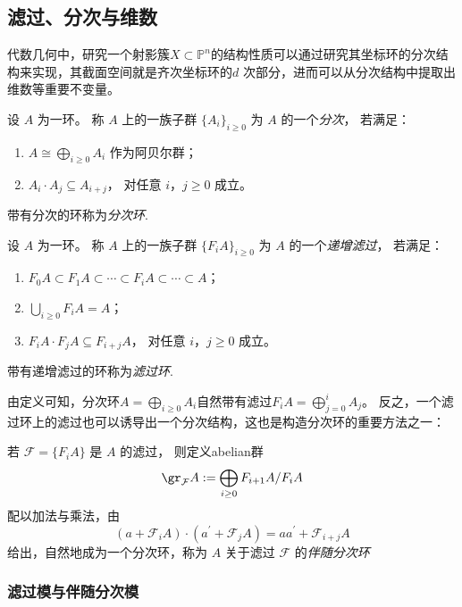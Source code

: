 \subsection{滤过、分次与维数}
代数几何中，研究一个射影簇$X\subset \mathbb{P}^n$的结构性质可以通过研究其坐标环的分次结构来实现，其截面空间就是齐次坐标环的$d$ 次部分，进而可以从分次结构中提取出维数等重要不变量。

\begin{definition}
    设 $A$ 为一环。 称 $A$ 上的一族子群 $\{A_i\}_{i\ge0}$ 为
    $A$ 的一个\emph{分次}，
    若满足：
    \begin{enumerate}[label=(\roman*)]
        \item
              $A\cong \bigoplus_{i\ge0}A_i$ 作为阿贝尔群；
        \item
              $A_i\cdot A_j\subseteq A_{i+j}$，
              对任意 $i，j\ge0$ 成立。
    \end{enumerate}
    带有分次的环称为\emph{分次环}.
\end{definition}


\begin{definition}
    设 $A$ 为一环。
    称 $A$ 上的一族子群 $\{F_iA\}_{i\ge0}$ 为
    $A$ 的一个\emph{递增滤过}，
    若满足：
    \begin{enumerate}[label=(\roman*)]
        \item
              $F_0A\subset F_1A\subset \cdots \subset F_iA\subset\cdots\subset A$；
        \item
              $\bigcup_{i\ge0}F_iA=A$；
        \item
              $F_iA\cdot F_jA\subseteq F_{i+j}A$，
              对任意 $i，j\ge0$ 成立。
    \end{enumerate}
    带有递增滤过的环称为\emph{滤过环}.
\end{definition}
由定义可知，分次环$A=\bigoplus_{i\ge0}A_i$自然带有滤过$F_iA=\bigoplus_{j=0}^i A_j$。
反之，一个滤过环上的滤过也可以诱导出一个分次结构，这也是构造分次环的重要方法之一：
\begin{proposition}
    若 $\mathcal{F}=\{F_iA\}$ 是 $A$ 的滤过，
    则定义abelian群
    \[
        \gr_{\mathcal{F}}A
        :=
        \bigoplus_{i\ge0}F_{i+1}A/F_iA
    \]
    配以加法与乘法，由
    \[
        (a+\mathcal{F}_iA)\cdot (a^\prime+\mathcal{F}_jA)
        =
        aa^\prime+\mathcal{F}_{i+j}A
    \]
    给出，自然地成为一个分次环，称为 $A$ 关于滤过 $\mathcal{F}$ 的\emph{伴随分次环}
\end{proposition}

\subsubsection{滤过模与伴随分次模}


